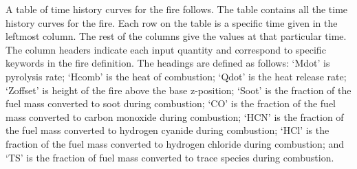 A table of time history curves for the fire follows.  The table contains all the time history curves for the fire.  Each row on the table is a specific time given in the leftmost column.  The rest of the columns give the values at that particular time.  The column headers indicate each input quantity and correspond to specific keywords in the fire definition. The headings are defined as follows: `Mdot' is pyrolysis rate; `Hcomb' is the heat of combustion; `Qdot' is the heat release rate; `Zoffset' is height of the fire above the base z-position; `Soot' is the fraction of the fuel mass converted to soot during combustion; `CO' is the fraction of the fuel mass converted to carbon monoxide during combustion; `HCN' is the fraction of the fuel mass converted to hydrogen cyanide during combustion; `HCl' is the fraction of the fuel mass converted to hydrogen chloride during combustion; and `TS' is the fraction of fuel mass converted to trace species during combustion.


